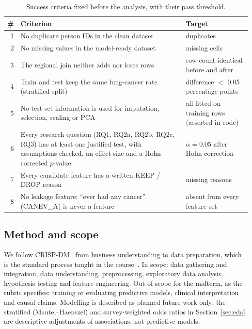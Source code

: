 \begin{table}[htbp]
\centering\small
\caption{Success criteria fixed before the analysis, with their pass threshold.}\label{tab:criteria-def}
\begin{tabularx}{\textwidth}{@{}r >{\raggedright\arraybackslash}X >{\raggedright\arraybackslash}p{5cm}@{}}
\toprule
\# & Criterion & Target \\
\midrule
1 & No duplicate person IDs in the clean dataset & 0 duplicates \\
2 & No missing values in the model-ready dataset & 0 missing cells \\
3 & The regional join neither adds nor loses rows & row count identical before and after \\
4 & Train and test keep the same lung-cancer rate (stratified split) & difference $<$ 0.05 percentage points \\
5 & No test-set information is used for imputation, selection, scaling or PCA & all fitted on training rows (asserted in code) \\
6 & Every research question (RQ1, RQ2a, RQ2b, RQ2c, RQ3) has at least one justified test, with assumptions checked, an effect size and a Holm-corrected $p$-value & $\alpha = 0.05$ after Holm correction \\
7 & Every candidate feature has a written KEEP / DROP reason & 0 missing reasons \\
8 & No leakage feature: ``ever had any cancer'' (CANEV\_A) is never a feature & absent from every feature set \\
\bottomrule
\end{tabularx}
\end{table}

\subsection{Method and scope}\label{sec:method}

We follow CRISP-DM~\cite{crispdm} from business understanding to data preparation, which is the standard process taught in the course~\cite[Chapter~1]{louati}. In scope: data gathering and integration, data understanding, preprocessing, exploratory data analysis, hypothesis testing and feature engineering. Out of scope for the midterm, as the rubric specifies: training or evaluating predictive models, clinical interpretation and causal claims. Modelling is described as planned future work only; the stratified (Mantel--Haenszel) and survey-weighted odds ratios in Section~\ref{sec:eda} are descriptive adjustments of associations, not predictive models.

